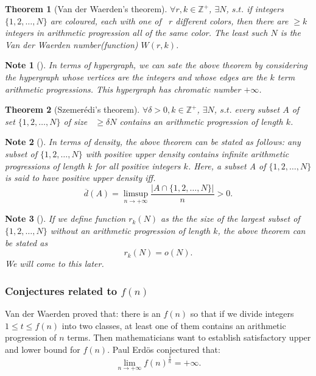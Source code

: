 \documentclass[12pt]{article}
\newtheorem{note}{Note}
\newtheorem{theorem}{Theorem}
\begin{document}
\begin{theorem}[Van der Waerden's theorem\cite{van}]
$\forall r, k \in \mathbb{Z}^{+}$, $\exists N$, $s.t.$ if integers $\{1, 2, \hdots, N\}$ are coloured, each with one of ~$r$ different colors, then there are $\geq k$ integers in arithmetic progression all of the same color. The least such $N$ is the Van der Waerden number(function) $W(r, k)$.
\end{theorem}

\begin{note}[\cite{erdos}]
In terms of hypergraph, we can sate the above theorem by considering the hypergraph whose vertices are the integers and whose edges are the $k$ term arithmetic progressions. This hypergraph has chromatic number $+\infty$.
\end{note}

\begin{theorem}[Szemer\'{e}di's theorem\cite{sz}]
$\forall \delta > 0, k \in \mathbb{Z}^{+}$, $\exists N$, $s.t.$ every subset $A$ of set $\{1, 2, \hdots, N\}$ of size ~$\geq \delta N$ contains an arithmetic progression of length $k$.
\end{theorem}

\begin{note}[\cite{sz}]
In terms of density\cite{density}, the above theorem can be stated as follows: any subset of $\{1, 2, \hdots, N\}$ with positive upper density contains infinite arithmetic progressions of length $k$ for all positive integers $k$. Here, a subset A of $\{1, 2,\hdots, N\}$ is said to have positive upper density iff. 
\[  \overline{d}(A) = \limsup_{n \to +\infty} \frac{|A \cap \{1, 2, \hdots, N\}|}{n} > 0. \]
\end{note}

\begin{note}[\cite{sz}]
If we define function $r_k(N)$ as the the size of the largest subset of $\{1, 2, \hdots, N\}$ without an arithmetic progression of length $k$, the above theorem can be stated as 
\[ r_k(N) = o(N). \]
We will come to this later.
\end{note}

\subsubsection{Conjectures related to $f(n)$}

Van der Waerden\cite{vanpaper} proved that: there is an $f(n)$ so that if we divide integers $1 \leq t \leq f(n)$ into two classes, at least one of them contains an arithmetic progression of $n$ terms. Then mathematicians want to establish satisfactory upper and lower bound for $f(n)$. Paul Erd\"{o}s conjectured that:
\begin{equation}\label{fn}
\lim_{n \to +\infty}f(n)^{\frac{1}{n}}=+\infty.
\end{equation}
\end{document}
